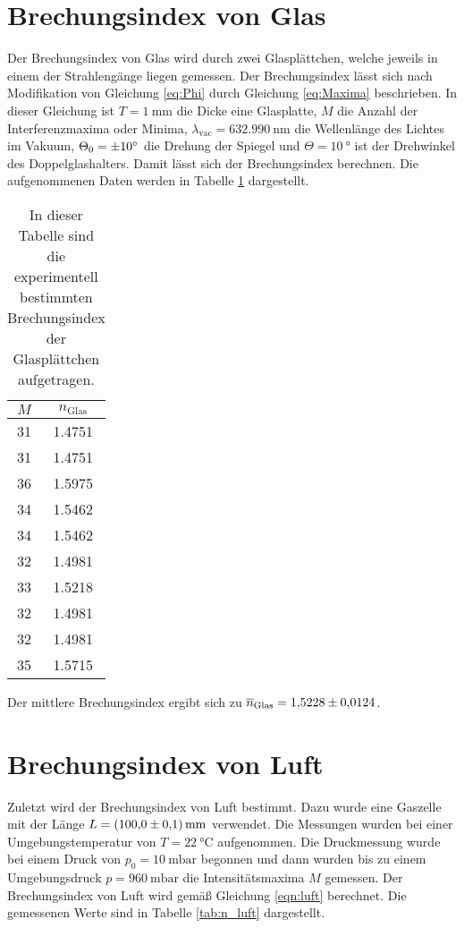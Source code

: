 \section{Brechungsindex von Glas}
\label{sec:n_glas}
Der Brechungsindex von Glas wird durch zwei Glasplättchen, welche jeweils in einem der Strahlengänge liegen gemessen. Der Brechungsindex lässt sich nach Modifikation von Gleichung 
\ref{eq:Phi} durch Gleichung \ref{eq:Maxima} beschrieben. In dieser Gleichung ist $T = \qty{1}{\milli\metre}$ die Dicke eine Glasplatte, $M$ die Anzahl der Interferenzmaxima oder 
Minima, $\lambda_\mathrm{vac} = \qty{632.990}{\nano\metre}$ die Wellenlänge des Lichtes im Vakuum, $\Theta_0 = \qty{\pm 10}{\degree}$ die Drehung der Spiegel und 
$\Theta = \qty{10}{\degree}$ ist der Drehwinkel des Doppelglashalters. Damit lässt sich der Brechungsindex berechnen. Die aufgenommenen Daten werden in Tabelle \ref{tab:n_glas} 
dargestellt.

\begin{table}[htbp] 
  \centering 
  \begin{tabular}{c c} 
      \toprule $M$ & $n_\mathrm{Glas}$\\ 
      \midrule 
      31 & 1.4751 \\
      31 & 1.4751 \\
      36 & 1.5975 \\
      34 & 1.5462 \\
      34 & 1.5462 \\
      32 & 1.4981 \\
      33 & 1.5218 \\
      32 & 1.4981 \\
      32 & 1.4981 \\
      35 & 1.5715 \\

      \bottomrule 
  \end{tabular} 
  \caption[Tabelle]{In dieser Tabelle sind die experimentell bestimmten Brechungsindex der Glasplättchen aufgetragen.} 
  \label{tab:n_glas} 
\end{table}

Der mittlere Brechungsindex ergibt sich zu $\overline{n}_\mathrm{Glas} = \num{1.5228 \pm 0.0124}$.

\section{Brechungsindex von Luft}
\label{sec:n_luft}
Zuletzt wird der Brechungsindex von Luft bestimmt. Dazu wurde eine Gaszelle mit der Länge $L = \qty{100 \pm 0.1}{\milli\metre}$ verwendet. Die Messungen wurden bei einer Umgebungstemperatur 
von $T = \qty{22}{\celsius}$ aufgenommen. Die Druckmessung wurde bei einem Druck von 
$p_0 = \qty{10}{\milli\bar}$ begonnen und dann wurden bis zu einem Umgebungsdruck $p = \qty{960}{\milli\bar}$ die Intensitätsmaxima $M$ gemessen. Der Brechungsindex von Luft wird gemäß 
Gleichung \ref{eqn:luft} berechnet. Die gemessenen Werte sind in Tabelle \ref{tab:n_luft} dargestellt.

